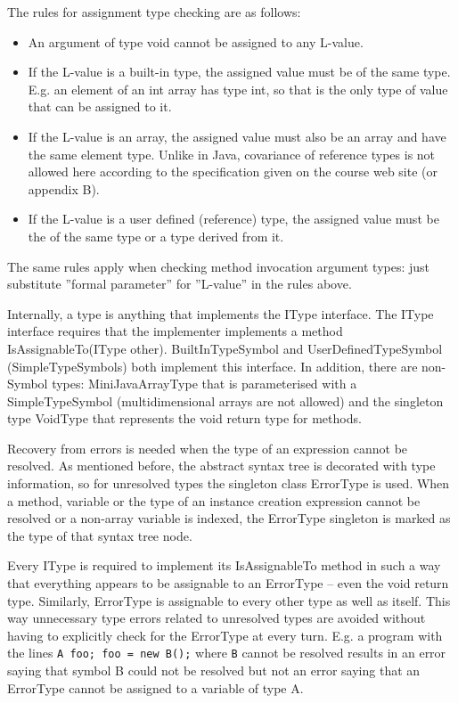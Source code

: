 \documentclass[a4paper,11pt]{article}
\begin{document}
The rules for assignment type checking are as follows:
\begin{itemize}
\item An argument of type void cannot be assigned to any L-value.
\item If the L-value is a built-in type, the assigned value must be of the same type. E.g. an element of an int array has type int, so that is the only type of value that can be assigned to it.
\item If the L-value is an array, the assigned value must also be an array and have the same element type. Unlike in Java, covariance of reference types is not allowed here according to the specification given on the course web site (or appendix B).
\item If the L-value is a user defined (reference) type, the assigned value must be the of the same type or a type derived from it.
\end{itemize}

The same rules apply when checking method invocation argument types: just substitute ''formal parameter'' for ''L-value'' in the rules above.

Internally, a type is anything that implements the IType interface. The IType interface requires that the implementer implements a method IsAssignableTo(IType other). BuiltInTypeSymbol and UserDefinedTypeSymbol (SimpleTypeSymbols) both implement this interface. In addition, there are non-Symbol types: MiniJavaArrayType that is parameterised with a SimpleTypeSymbol (multidimensional arrays are not allowed) and the singleton type VoidType that represents the void return type for methods.

Recovery from errors is needed when the type of an expression cannot be resolved. As mentioned before, the abstract syntax tree is decorated with type information, so for unresolved types the singleton class ErrorType is used. When a method, variable or the type of an instance creation expression cannot be resolved or a non-array variable is indexed, the ErrorType singleton is marked as the type of that syntax tree node.

Every IType is required to implement its IsAssignableTo method in such a way that everything appears to be assignable to an ErrorType -- even the void return type. Similarly, ErrorType is assignable to every other type as well as itself. This way unnecessary type errors related to unresolved types are avoided without having to explicitly check for the ErrorType at every turn. E.g. a program with the lines \verb,A foo; foo = new B();, where \verb,B, cannot be resolved results in an error saying that symbol B could not be resolved but not an error saying that an ErrorType cannot be assigned to a variable of type A.
\end{document}
